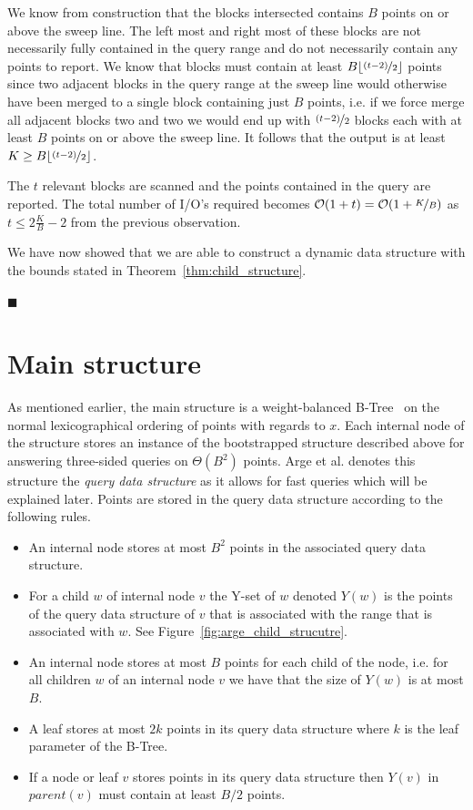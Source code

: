 \documentclass[twoside,11pt,openright]{report}
\begin{document}
We know from construction that the blocks intersected contains $B$ points on or above the sweep line. The left most and right most of these blocks are not necessarily fully contained in the query range and do not necessarily contain any points to report. We know that blocks must contain at least $B\lfloor \nicefrac{(t-2)}{2}\rfloor$ points since two adjacent blocks in the query range at the sweep line would otherwise have been merged to a single block containing just $B$ points, i.e. if we force merge all adjacent blocks two and two we would end up with $\nicefrac{(t-2)}{2}$ blocks each with at least $B$ points on or above the sweep line. It follows that the output is at least $K \geq B\lfloor \nicefrac{(t-2)}{2}\rfloor$.

The $t$ relevant blocks are scanned and the points contained in the query are reported. The total number of I/O's required becomes $\mathcal{O}(1+t) = \mathcal{O}(1+\nicefrac{K}{B})$ as $t \leq 2\frac{K}{B}-2$ from the previous observation.

We have now showed that we are able to construct a dynamic data structure with the bounds stated in Theorem~\ref{thm:child_structure}.

\hfill$\blacksquare$

\section{Main structure}
\label{sec:arge_structure}
As mentioned earlier, the main structure is a weight-balanced B-Tree~\cite{arge_vitter_1996} on the normal lexicographical ordering of points with regards to $x$. Each internal node of the structure stores an instance of the bootstrapped structure described above for answering three-sided queries on $\Theta(B^2)$ points. Arge et al. denotes this structure the \textit{query data structure} as it allows for fast queries which will be explained later. Points are stored in the query data structure according to the following rules.
\begin{itemize}
	\item{An internal node stores at most $B^2$ points in the associated query data structure.}
	\item{For a child $w$ of internal node $v$ the Y-set of $w$ denoted $Y(w)$ is the points of the query data structure of $v$ that is associated with the range that is associated with $w$. See Figure~\ref{fig:arge_child_strucutre}.}
	\item{An internal node stores at most $B$ points for each child of the node, i.e. for all children $w$ of an internal node $v$ we have that the size of $Y(w)$ is at most $B$.}
	\item{A leaf stores at most $2k$ points in its query data structure where $k$ is the leaf parameter of the B-Tree.}
	\item{If a node or leaf $v$ stores points in its query data structure then $Y(v)$ in $parent(v)$ must contain at least $B/2$ points.}
\end{itemize}
\end{document}
